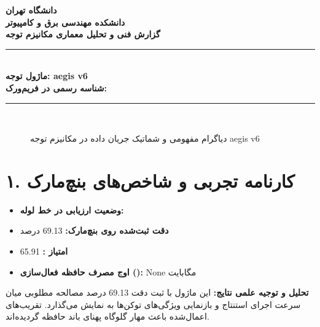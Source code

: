 \documentclass[12pt,a4paper]{article}
\begin{document}
\begin{center}
{\Large\bfseries دانشگاه تهران}\\[0.2cm]
{\large\bfseries دانشکده مهندسی برق و کامپیوتر}\\[0.2cm]
{\large\bfseries گزارش فنی و تحلیل معماری مکانیزم توجه}\\[0.5cm]
\rule{\linewidth}{1pt}\\[0.3cm]
{\LARGE\bfseries ماژول توجه: aegis v6}\\[0.2cm]
{\large \textbf{شناسه رسمی در فریم‌ورک:} }\\[0.2cm]
\rule{\linewidth}{1pt}\\[0.5cm]
\end{center}

\begin{figure}[H]
\centering
{}
\caption{دیاگرام مفهومی و شماتیک جریان داده در مکانیزم توجه aegis v6}
\end{figure}

\section*{۱. کارنامه تجربی و شاخص‌های بنچ‌مارک}
\begin{itemize}
\item \textbf{وضعیت ارزیابی در خط لوله:} 
\item \textbf{دقت ثبت‌شده روی بنچ‌مارک:} 69.13 درصد
\item \textbf{امتیاز :} 65.91
\item \textbf{اوج مصرف حافظه فعال‌سازی ():} None مگابایت
\end{itemize}
\textbf{تحلیل و توجیه علمی نتایج:} این ماژول با ثبت دقت 69.13 درصد مصالحه مطلوبی میان سرعت اجرای استنتاج و بازنمایی ویژگی‌های توکن‌ها به نمایش می‌گذارد. تقریب‌های اعمال‌شده باعث مهار گلوگاه پهنای باند حافظه گردیده‌اند.
\end{document}
